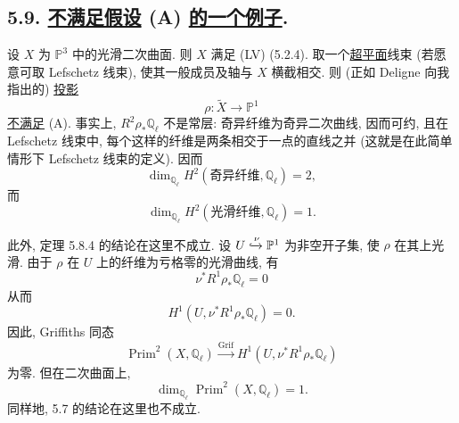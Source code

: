 \subsection*{5.9. \underline{不满足假设} (A)
\underline{的一个例子}.}

设 $X$ 为 $\mathbb P^3$ 中的光滑二次曲面. 则 $X$ 满足 (LV) (5.2.4). 取一个\underline{超平面}线束 (若愿意可取 Lefschetz 线束), 使其一般成员及轴与 $X$ 横截相交. 则 (正如 Deligne 向我指出的) \underline{投影}
\[
\rho:\widetilde X\longrightarrow\mathbb P^1
\]
\underline{不满足} (A).  事实上, $R^2\rho_*\mathbb Q_\ell$ 不是常层: 奇异纤维为奇异二次曲线, 因而可约, 且在 Lefschetz 线束中, 每个这样的纤维是两条相交于一点的直线之并 (这就是在此简单情形下 Lefschetz 线束的定义). 因而
\[
\dim_{\mathbb Q_\ell}H^2(\text{奇异纤维},\mathbb Q_\ell)=2,
\]
而
\[
\dim_{\mathbb Q_\ell}H^2(\text{光滑纤维},\mathbb Q_\ell)=1.
\]

此外, 定理 5.8.4 的结论在这里不成立. 设 $U\xhookrightarrow{\nu}\mathbb P^1$ 为非空开子集, 使 $\rho$ 在其上光滑. 由于 $\rho$ 在 $U$ 上的纤维为亏格零的光滑曲线, 有
\[
\nu^*R^1\rho_*\mathbb Q_\ell=0
\]
从而
\[
H^1(U,\nu^*R^1\rho_*\mathbb Q_\ell)=0.
\]
因此, Griffiths 同态
\[
\operatorname{Prim}^2(X,\mathbb Q_\ell)
\xrightarrow{\operatorname{Grif}}
H^1(U,\nu^*R^1\rho_*\mathbb Q_\ell)
\]
为零. 但在二次曲面上,
\[
\dim_{\mathbb Q_\ell}\operatorname{Prim}^2(X,\mathbb Q_\ell)=1.
\]
同样地, 5.7 的结论在这里也不成立.
